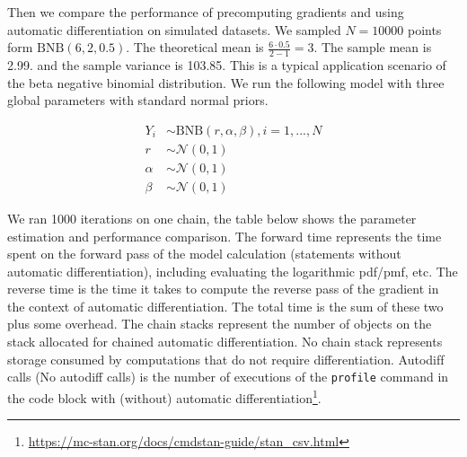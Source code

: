 \documentclass[11pt]{article}
\begin{document}
Then we compare the performance of precomputing gradients and using automatic differentiation on simulated datasets. We sampled $N=10000$ points form $\text{BNB}(6,2,0.5)$. The theoretical mean is $\frac{6\cdot 0.5}{2-1}=3$. The sample mean is 2.99.  and the sample variance is 103.85. This is a typical application scenario of the beta negative binomial distribution. We run the following model with three global parameters with standard normal priors.

\begin{equation}
  \begin{aligned}
	Y_{i} &\sim \text{BNB}(r, \alpha, \beta), i=1,...,N\\
	r &\sim \mathcal{N}(0,1) \\
	\alpha &\sim \mathcal{N}(0,1) \\
	\beta &\sim \mathcal{N}(0,1)
  \end{aligned}
\end{equation}

We ran 1000 iterations on one chain, the table below shows the parameter estimation and performance comparison. The forward time represents the time spent on the forward pass of the model calculation (statements without automatic differentiation), including evaluating the logarithmic pdf/pmf, etc. The reverse time is the time it takes to compute the reverse pass of the gradient in the context of automatic differentiation. The total time is the sum of these two plus some overhead. The chain stacks represent the number of objects on the stack allocated for chained automatic differentiation. No chain stack represents storage consumed by computations that do not require differentiation. Autodif‌f calls (No autodiff calls) is the number of executions of the \verb|profile| command in the code block with (without) automatic differentiation\footnote{\url{https://mc-stan.org/docs/cmdstan-guide/stan_csv.html}}.
\end{document}
